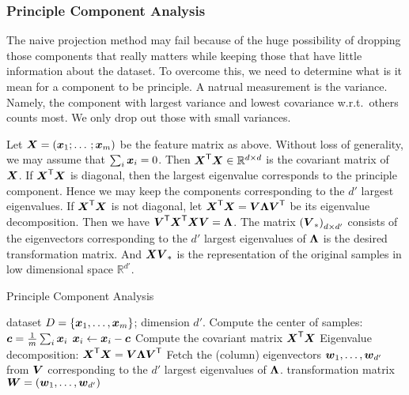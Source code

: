 \subsubsection{Principle Component Analysis}
The naive projection method may fail because of the huge possibility of dropping those components that really
matters while keeping those that have little information about the dataset. To overcome this, we need to
determine what is it mean for a component to be principle. A natrual measurement is the variance. Namely, 
the component with largest variance and lowest covariance w.r.t.\ others counts most. We only drop out those 
with small variances. 
\par
Let $\boldsymbol{X} = {\left(\boldsymbol{x}_1; \dotsc; \boldsymbol{x}_m\right)}$ be the feature matrix as above. Without loss of 
generality, we may assume that $\sum_i \boldsymbol{x}_i = 0$. Then ${\boldsymbol{X}}^\mathsf{T}\boldsymbol{X} \in \mathbb{R}^{d \times d}$ is the
covariant matrix of $\boldsymbol{X}$. If ${\boldsymbol{X}}^\mathsf{T}\boldsymbol{X}$ is diagonal, then the largest eigenvalue corresponds to the 
principle component. Hence we may keep the components corresponding to the $d'$ largest eigenvalues. If 
${\boldsymbol{X}}^\mathsf{T}\boldsymbol{X}$ is not diagonal, let ${\boldsymbol{X}}^\mathsf{T}\boldsymbol{X} = \boldsymbol{V}\boldsymbol{\Lambda}{\boldsymbol{V}}^\mathsf{T}$ be its eigenvalue 
decomposition. Then we have ${\boldsymbol{V}}^\mathsf{T}{\boldsymbol{X}}^\mathsf{T}\boldsymbol{X}\boldsymbol{V} = \boldsymbol{\Lambda}$. The matrix 
${\left(\boldsymbol{V}_*\right)}_{d \times d'}$ consists of the eigenvectors corresponding to the $d'$ largest 
eigenvalues of $\boldsymbol{\Lambda}$ is the desired transformation matrix. And $\boldsymbol{X}\boldsymbol{V}_*$ is the representation of
the original samples in low dimensional space $\mathbb{R}^{d'}$.

\begin{algorithm}
    \caption{Principle Component Analysis}\label{algorithm:pca}
    \begin{algorithmic}[1]
        \Require dataset $D = \left\{\boldsymbol{x}_1, \dotsc, \boldsymbol{x}_m\right\}$; dimension $d'$.
        \State Compute the center of samples: $\boldsymbol{c} = \frac{1}{m}\sum_i \boldsymbol{x}_i$
        \State $\boldsymbol{x}_i \gets \boldsymbol{x}_i -\boldsymbol{c}$
        \State Compute the covariant matrix ${\boldsymbol{X}}^\mathsf{T}\boldsymbol{X}$
        \State Eigenvalue decomposition: ${\boldsymbol{X}}^\mathsf{T}\boldsymbol{X} = \boldsymbol{V}\boldsymbol{\Lambda}{\boldsymbol{V}}^\mathsf{T}$
        \State Fetch the (column) eigenvectors $\boldsymbol{w}_1, \dotsc, \boldsymbol{w}_{d'}$ from $\boldsymbol{V}$ corresponding to the
        $d'$ largest eigenvalues of $\boldsymbol{\Lambda}$.
        \Ensure transformation matrix $\boldsymbol{W} = \left(\boldsymbol{w}_1, \dotsc, \boldsymbol{w}_{d'}\right)$
    \end{algorithmic}
\end{algorithm}

